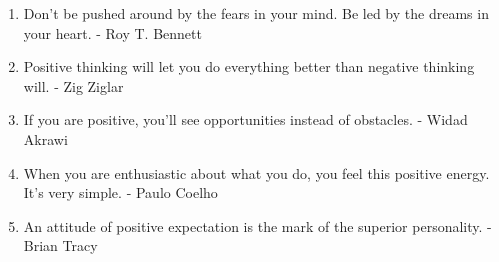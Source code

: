 \begin{enumerate}
        \item Don’t be pushed around by the fears in your mind. Be led by the dreams in your heart. - Roy T. Bennett

        \item Positive thinking will let you do everything better than negative thinking will.
        - Zig Ziglar

        \item If you are positive, you’ll see opportunities instead of obstacles. - Widad Akrawi

        \item When you are enthusiastic about what you do, you feel this positive energy. It’s very simple. - Paulo Coelho

        \item An attitude of positive expectation is the mark of the superior personality. - Brian Tracy
        
    \end{enumerate}


